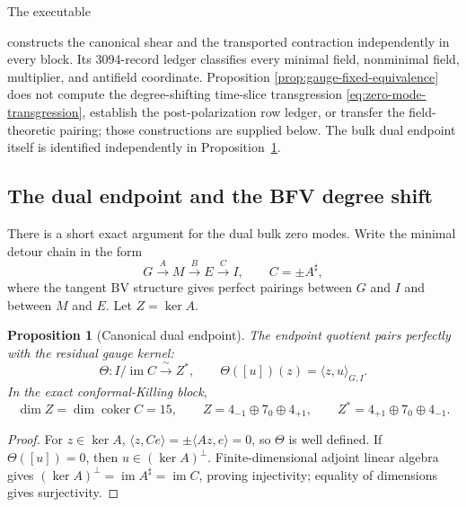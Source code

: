\documentclass[11pt]{article}
\newtheorem{proposition}[theorem]{Proposition}
\theoremstyle{definition}
\theoremstyle{remark}
\begin{document}
The executable
\begin{center}
\end{center}
constructs the canonical shear and the transported contraction independently
in every block.  Its 3094-record ledger classifies every minimal field, nonminimal
field, multiplier, and antifield coordinate.  Proposition
\ref{prop:gauge-fixed-equivalence} does not compute the degree-shifting
time-slice transgression \eqref{eq:zero-mode-transgression}, establish the
post-polarization row ledger, or transfer the field-theoretic pairing;
those constructions are supplied below.  The bulk dual endpoint itself is
identified independently in Proposition~\ref{prop:dual-endpoint}.

\subsection{The dual endpoint and the BFV degree shift}

There is a short exact argument for the dual bulk zero modes.  Write the
minimal detour chain in the form
\begin{equation}
 G\xrightarrow{A}M\xrightarrow{B}E\xrightarrow{C}I,
 \qquad C=\pm A^\sharp,
\end{equation}
where the tangent BV structure gives perfect pairings between $G$ and $I$
and between $M$ and $E$.  Let $Z=\ker A$.

\begin{proposition}[Canonical dual endpoint]\label{prop:dual-endpoint}
The endpoint quotient pairs perfectly with the residual gauge kernel:
\begin{equation}\label{eq:dual-endpoint}
 \boxed{
 \Theta:I/\operatorname{im}C\xrightarrow{\ \sim\ }Z^*,
 \qquad \Theta([u])(z)=\langle z,u\rangle_{G,I}.}
\end{equation}
In the exact conformal-Killing block,
\begin{equation}
 \dim Z=\dim\operatorname{coker}C=15,
 \qquad
 Z=4_{-1}\oplus7_0\oplus4_{+1},
 \qquad
 Z^*=4_{+1}\oplus7_0\oplus4_{-1}.
\end{equation}
\end{proposition}

\begin{proof}
For $z\in\ker A$,
$\langle z,Ce\rangle=\pm\langle Az,e\rangle=0$, so $\Theta$ is
well defined.  If $\Theta([u])=0$, then
$u\in(\ker A)^\perp$.  Finite-dimensional adjoint linear algebra gives
$(\ker A)^\perp=\operatorname{im}A^\sharp=\operatorname{im}C$, proving
injectivity; equality of dimensions gives surjectivity.
\end{proof}
\end{document}
